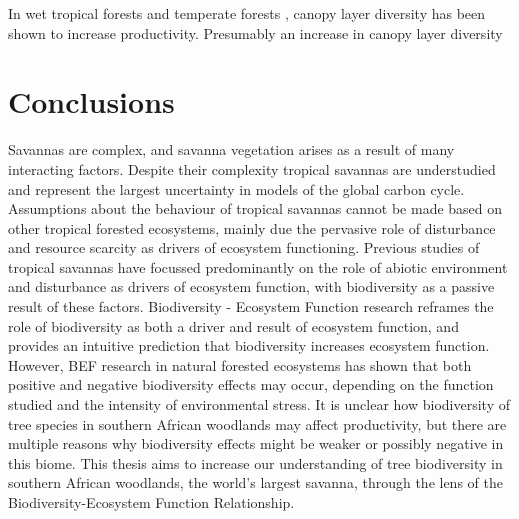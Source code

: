 \begin{refsection}
In wet tropical forests \citep{} and temperate forests \citep{Danescu2016}, canopy layer diversity has been shown to increase productivity. Presumably an increase in canopy layer diversity 

\section{Conclusions}

Savannas are complex, and savanna vegetation arises as a result of many interacting factors. Despite their complexity tropical savannas are understudied and represent the largest uncertainty in models of the global carbon cycle. Assumptions about the behaviour of tropical savannas cannot be made based on other tropical forested ecosystems, mainly due the pervasive role of disturbance and resource scarcity as drivers of ecosystem functioning. Previous studies of tropical savannas have focussed predominantly on the role of abiotic environment and disturbance as drivers of ecosystem function, with biodiversity as a passive result of these factors. Biodiversity - Ecosystem Function research reframes the role of biodiversity as both a driver and result of ecosystem function, and provides an intuitive prediction that biodiversity increases ecosystem function. However, BEF research in natural forested ecosystems has shown that both positive and negative biodiversity effects may occur, depending on the function studied and the intensity of environmental stress. It is unclear how biodiversity of tree species in southern African woodlands may affect productivity, but there are multiple reasons why biodiversity effects might be weaker or possibly negative in this biome. This thesis aims to increase our understanding of tree biodiversity in southern African woodlands, the world's largest savanna, through the lens of the Biodiversity-Ecosystem Function Relationship.

\newpage{}
\begingroup
{}
\printbibliography[heading=subbibintoc]
\endgroup

\end{refsection}

